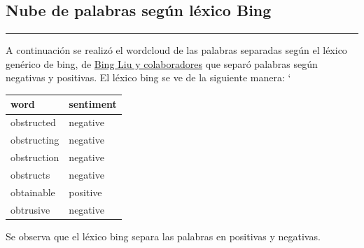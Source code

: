 \documentclass[
]{article}
\begin{document}
\hypertarget{nube-de-palabras-seguxfan-luxe9xico-bing}{%
\subsection{\texorpdfstring{\textbf{Nube de palabras según léxico
Bing}}{Nube de palabras según léxico Bing}}\label{nube-de-palabras-seguxfan-luxe9xico-bing}}

\begin{center}\rule{0.5\linewidth}{0.5pt}\end{center}

A continuación se realizó el wordcloud de las palabras separadas según
el léxico genérico de bing, de
\href{https://www.cs.uic.edu/~liub/FBS/sentiment-analysis.html}{Bing Liu
y colaboradores} que separó palabras según negativas y positivas. El
léxico bing se ve de la siguiente manera: `

\begin{table}[H]
\centering
\begin{tabular}[t]{l|l}
\hline
word & sentiment\\
\hline
obstructed & negative\\
\hline
obstructing & negative\\
\hline
obstruction & negative\\
\hline
obstructs & negative\\
\hline
obtainable & positive\\
\hline
obtrusive & negative\\
\hline
\end{tabular}
\end{table}

Se observa que el léxico bing separa las palabras en positivas y
negativas.
\end{document}
